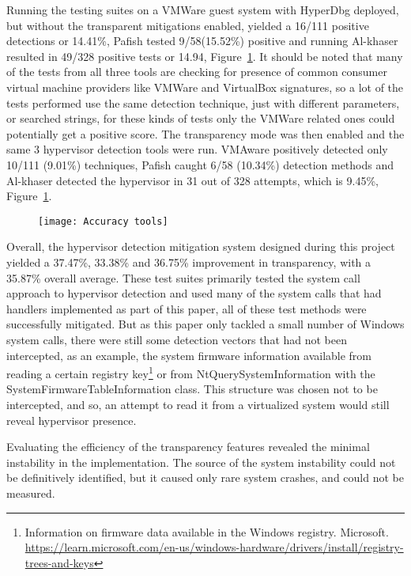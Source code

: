 Running the testing suites on a VMWare guest system with HyperDbg deployed, but without the transparent mitigations enabled, yielded a 16/111 positive detections or 14.41\%, 
Pafish tested 9/58(15.52\%) positive and running Al-khaser resulted in 49/328 positive tests or 14.94, Figure~\ref{fig:test_accuracy}.
It should be noted that many of the tests from all three tools are checking for presence of common consumer virtual machine providers like VMWare and VirtualBox signatures, 
so a lot of the tests performed use the same detection technique, just with different parameters, or searched strings, for these kinds of tests only the VMWare related ones could potentially get a positive score. 
The transparency mode was then enabled and the same 3 hypervisor detection tools were run. VMAware positively detected only 10/111 (9.01\%) techniques, Pafish caught 6/58 (10.34\%) detection methods and 
Al-khaser detected the hypervisor in 31 out of 328 attempts, which is 9.45\%, Figure~\ref{fig:test_accuracy}.
\begin{figure}[tbh]
    \texttt{[image: Accuracy tools]} %
    \label{fig:test_accuracy}
\end{figure}

Overall, the hypervisor detection mitigation system designed during this project yielded a 37.47\%, 33.38\% and 36.75\% improvement in transparency, 
with a 35.87\% overall average. These test suites primarily tested the system call approach to hypervisor detection and used many of the system calls that had handlers implemented as part of this paper, 
all of these test methods were successfully mitigated. But as this paper only tackled a small number of Windows system calls, there were still some detection vectors that had not been intercepted, 
as an example, the system firmware information available from reading a certain registry key\footnote{Information on firmware data available in the Windows registry. Microsoft. \url{https://learn.microsoft.com/en-us/windows-hardware/drivers/install/registry-trees-and-keys}} 
or from NtQuerySystemInformation with the SystemFirmwareTableInformation class. This structure was chosen not to be intercepted, and so, 
an attempt to read it from a virtualized system would still reveal hypervisor presence.

Evaluating the efficiency of the transparency features revealed the minimal instability in the implementation. The source of the system instability 
could not be definitively identified, but it caused only rare system crashes, and could not be measured.



